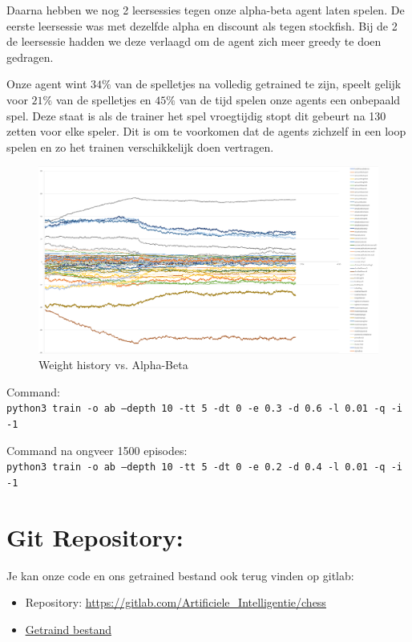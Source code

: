 \documentclass[a4paper,openany]{uantwerpenassignment}
\newcommand{\codeword}[1]{
    \colorbox{code}{\texttt{\textcolor{codetext}{#1}}}
}
\begin{document}
Daarna hebben we nog 2 leersessies tegen onze alpha-beta agent laten spelen. De eerste leersessie was met dezelfde alpha en discount als tegen stockfish. Bij de 2 de leersessie hadden we deze verlaagd om de agent zich meer greedy te doen gedragen.

Onze agent wint $34\%$ van de spelletjes na volledig getrained te zijn, speelt gelijk voor $21\%$ van de spelletjes en $45\%$ van de tijd spelen onze agents een onbepaald spel. Deze staat is als de trainer het spel vroegtijdig stopt dit gebeurt na 130 zetten voor elke speler. Dit is om te voorkomen dat de agents zichzelf in een loop spelen en zo het trainen verschikkelijk doen vertragen.

\begin{figure}[h]
    \centering
    \includegraphics[width=\textwidth]{images/ab.png}
    \caption{Weight history vs. Alpha-Beta}
    \label{fig:ab}
\end {figure}

Command:\\
\codeword{python3 train -o ab --depth 10 -tt 5 -dt 0 -e 0.3 -d 0.6 -l 0.01 -q -i -1}

Command na ongveer 1500 episodes:\\
\codeword{python3 train -o ab --depth 10 -tt 5 -dt 0 -e 0.2 -d 0.4 -l 0.01 -q -i -1}

\section{Git Repository:}
Je kan onze code en ons getrained bestand ook terug vinden op gitlab: 
\begin{itemize}
    \item Repository: \href{https://gitlab.com/Artificiele_Intelligentie/chess}{\color{blue}\underline{https://gitlab.com/Artificiele\_Intelligentie/chess}}
    \item \href{https://gitlab.com/Artificiele_Intelligentie/chess/-/raw/master/grandQ.json}{\color{blue}\underline{Getraind bestand}}
\end{itemize}



\end{document}
